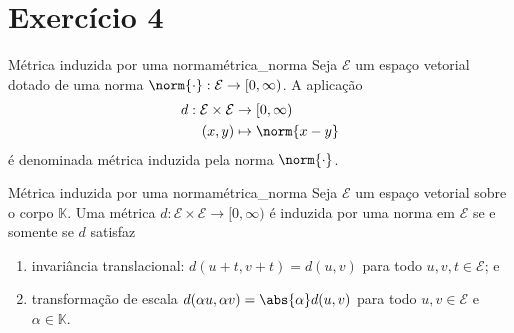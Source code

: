 \section*{Exercício 4}
\begin{definition}{Métrica induzida por uma norma}{métrica_norma}
    Seja \(\mathcal{E}\) um espaço vetorial dotado de uma norma \(\norm{\cdot} : \mathcal{E} \to [0, \infty)\). A aplicação
    \begin{align*}
        d : \mathcal{E} \times \mathcal{E} &\to [0, \infty)\\
                                     (x,y) &\mapsto \norm{x - y}
    \end{align*}
    é denominada métrica induzida pela norma \(\norm{\cdot}\).
\end{definition}

\begin{proposition}{Métrica induzida por uma norma}{métrica_norma}
    Seja \(\mathcal{E}\) um espaço vetorial sobre o corpo \(\mathbb{K}\). Uma métrica \(d : \mathcal{E} \times \mathcal{E} \to [0, \infty)\) é induzida por uma norma em \(\mathcal{E}\) se e somente se \(d\) satisfaz
    \begin{enumerate}[label=(\alph*)]
        \item invariância translacional: \(d(u + t, v + t) = d(u, v)\) para todo \(u,v,t \in \mathcal{E}\); e
        \item transformação de escala \(d(\alpha u , \alpha v) = \abs{\alpha}d(u, v)\) para todo \(u,v \in \mathcal{E}\) e \(\alpha \in \mathbb{K}\).
    \end{enumerate}
\end{proposition}
